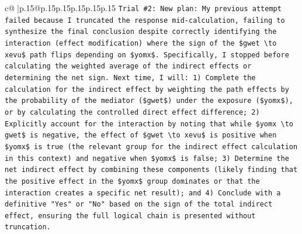 \documentclass{article}
\begin{document}
{\begin{supertabular}{c@{$\;$}|p{.15\linewidth}@{}p{.15\linewidth}p{.15\linewidth}p{.15\linewidth}p{.15\linewidth}p{.15\linewidth}}
{{{\texttt{Trial \#2: New plan: My previous attempt failed because I truncated the response mid{-}calculation, failing to synthesize the final conclusion despite correctly identifying the interaction (effect modification) where the sign of the \$gwet \textbackslash{}to xevu\$ path flips depending on \$yomx\$. Specifically, I stopped before calculating the weighted average of the indirect effects or determining the net sign. Next time, I will: 1) Complete the calculation for the indirect effect by weighting the path effects by the probability of the mediator (\$gwet\$) under the exposure (\$yomx\$), or by calculating the controlled direct effect difference; 2) Explicitly account for the interaction by noting that while \$yomx \textbackslash{}to gwet\$ is negative, the effect of \$gwet \textbackslash{}to xevu\$ is positive when \$yomx\$ is true (the relevant group for the indirect effect calculation in this context) and negative when \$yomx\$ is false; 3) Determine the net indirect effect by combining these components (likely finding that the positive effect in the \$yomx\$ group dominates or that the interaction creates a specific net result); and 4) Conclude with a definitive "Yes" or "No" based on the sign of the total indirect effect, ensuring the full logical chain is presented without truncation.} \\
\\ 
}}}
\end{supertabular}}
\end{document}
